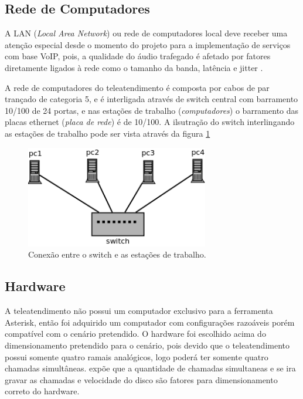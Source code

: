 \subsection{Rede de Computadores}
A LAN (\textit{Local Area Network}) ou rede de computadores local deve receber uma atenção especial desde o momento do projeto para a implementação de serviços com base VoIP, pois, a qualidade do áudio trafegado é afetado por fatores diretamente ligados à rede como o tamanho da banda, latência e jitter \cite{andersonramires2005}.

A rede de computadores do teleatendimento é composta por cabos de par trançado de categoria 5, e é interligada através de switch central com barramento 10/100 de 24 portas, e nas estações de trabalho (\textit{computadores}) o barramento das placas ethernet (\textit{placa de rede}) é de 10/100. A ilsutração do switch interlingando as estações de trabalho pode ser vista através da figura \ref{Figura17}

\begin{figure}[h]
	\centering
	\includegraphics[width=8cm]{imagens/switch.png}
	\caption{Conexão entre o switch e as estações de trabalho.}
    \label{Figura17}
\end{figure}

\subsection{Hardware}
A teleatendimento não possui um computador exclusivo para a ferramenta Asterisk, então foi adquirido um computador com configurações razoáveis porém compatível com o cenário pretendido. O hardware foi escolhido acima do dimensionamento pretendido para o cenário, pois devido que o teleatendimento possui somente quatro ramais analógicos, logo poderá ter somente quatro chamadas simultâneas.  expõe que a quantidade de chamadas simultaneas e se ira gravar as chamadas e velocidade do disco são fatores para dimensionamento correto do hardware. 


